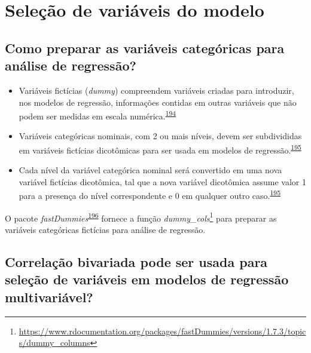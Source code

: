 \documentclass[
  a4paper,
]{book}
\renewcommand{\href}[2]{#2\footnote{\url{#1}}}
\newenvironment{infobox}[1]
  {
  \begin{itemize}
  \renewcommand{\labelitemi}{
    \raisebox{-.7\height}[0pt][0pt]{
      {\setkeys{Gin}{width=3em,keepaspectratio}
        \texttt{[image: \#1]}}
    }
  }
  \setlength{\fboxsep}{1em}
  \begin{blackbox}
  \item
  }
  {
  \end{blackbox}
  \end{itemize}
  }
\begin{document}
\hypertarget{selecao}{%
\section{Seleção de variáveis do modelo}\label{selecao}}

\hypertarget{como-preparar-as-variuxe1veis-categuxf3ricas-para-anuxe1lise-de-regressuxe3o}{%
\subsection{Como preparar as variáveis categóricas para análise de regressão?}\label{como-preparar-as-variuxe1veis-categuxf3ricas-para-anuxe1lise-de-regressuxe3o}}

\begin{itemize}
\item
  Variáveis fictícias (\emph{dummy}) compreendem variáveis criadas para introduzir, nos modelos de regressão, informações contidas em outras variáveis que não podem ser medidas em escala numérica.\textsuperscript{\protect\hyperlink{ref-suits1957}{194}}
\item
  Variáveis categóricas nominais, com 2 ou mais níveis, devem ser subdivididas em variáveis fictícias dicotômicas para ser usada em modelos de regressão.\textsuperscript{\protect\hyperlink{ref-Healy1995}{195}}
\item
  Cada nível da variável categórica nominal será convertido em uma nova variável fictícias dicotômica, tal que a nova variável dicotômica assume valor 1 para a presença do nível correspondente e 0 em qualquer outro caso.\textsuperscript{\protect\hyperlink{ref-Healy1995}{195}}
\end{itemize}

\begin{infobox}{images/Rlogo}
O pacote \emph{fastDummies}\textsuperscript{\protect\hyperlink{ref-fastDummies}{196}} fornece a função \href{https://www.rdocumentation.org/packages/fastDummies/versions/1.7.3/topics/dummy_columns}{\emph{dummy\_cols}} para preparar as variáveis categóricas fictícias para análise de regressão.

\end{infobox}

\hypertarget{correlauxe7uxe3o-bivariada-pode-ser-usada-para-seleuxe7uxe3o-de-variuxe1veis-em-modelos-de-regressuxe3o-multivariuxe1vel}{%
\subsection{Correlação bivariada pode ser usada para seleção de variáveis em modelos de regressão multivariável?}\label{correlauxe7uxe3o-bivariada-pode-ser-usada-para-seleuxe7uxe3o-de-variuxe1veis-em-modelos-de-regressuxe3o-multivariuxe1vel}}
\end{document}
